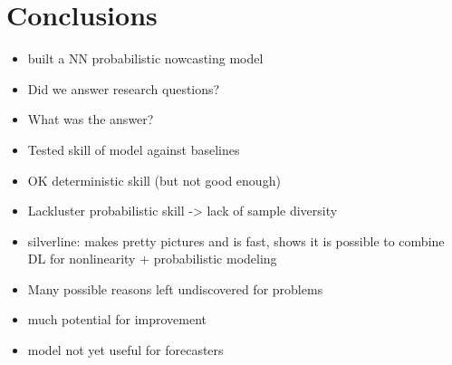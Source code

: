 \chapter{Conclusions}
\label{chapter:conclusions}

\begin{itemize}
	\item built a NN probabilistic nowcasting model
	\item Did we answer research questions?
	\item What was the answer? 
	\item Tested skill of model against baselines
	\item OK deterministic skill (but not good enough)
	\item Lackluster probabilistic skill -> lack of sample diversity 
	\item silverline: makes pretty pictures and is fast, shows it is possible to combine DL for nonlinearity + probabilistic modeling
	\item Many possible reasons left undiscovered for problems
	\item much potential  for improvement
	\item model not yet useful for forecasters
\end{itemize}
